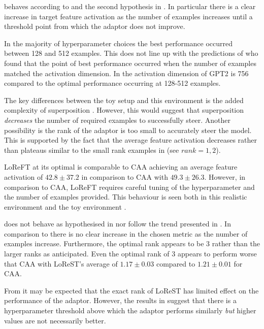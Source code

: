  behaves according to \citet{steering-clear} and the second hypothesis in . In particular there is a clear increase in target feature activation as the number of examples increases until a threshold point from which the adaptor does not improve.

In the majority of hyperparameter choices the best performance occurred between 128 and 512 examples.
This does not line up with the predictions of \citet{steering-clear} who found that the point of best performance occurred when the number of examples matched the activation dimension.
In  the activation dimension of GPT2 is 756 \citep{saelens} compared to the optimal performance occurring at 128-512 examples.

The key differences between the toy setup and this environment is the added complexity of superposition .
However, this would suggest that superposition \emph{decreases} the number of required examples to successfully steer.
Another possibility is the rank of the adaptor is too small to accurately steer the model.
This is supported by the fact that the average feature activation decreases rather than plateaus similar to the small rank examples in  (see $rank=1, 2$).

LoReFT at its optimal is comparable to CAA achieving an average feature activation of $42.8 \pm 37.2$ in comparison to CAA with $49.3 \pm 26.3$.
However, in comparison to CAA, LoReFT requires careful tuning of the hyperparameter and the number of examples provided.
This behaviour is seen both in this realistic environment and the toy environment .

 does not behave as hypothesised in  nor follow the trend presented in \citet{steering-clear}.
In comparison to  there is no clear increase in the chosen metric as the number of examples increase.
Furthermore, the optimal rank appears to be $3$ rather than the larger ranks as anticipated.
Even the optimal rank of $3$ appears to perform worse that CAA with LoReST's average of $1.17 \pm 0.03$ compared to $1.21 \pm 0.01$ for CAA.

From  it may be expected that the exact rank of LoReST has limited effect on the performance of the adaptor.
However, the results in  suggest that there is a hyperparameter threshold above which the adaptor performs similarly \emph{but} higher values are not necessarily better.

